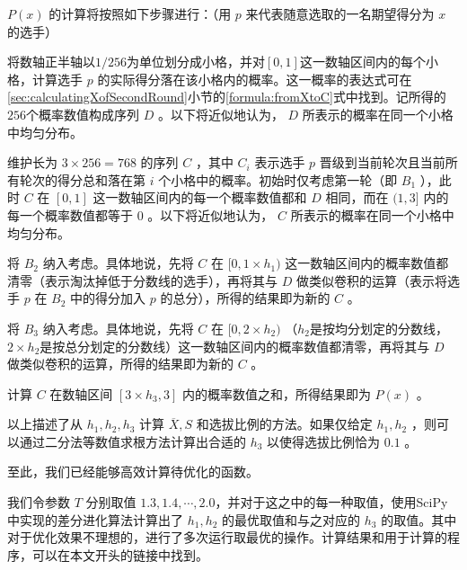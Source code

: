         $P(x)$ 的计算将按照如下步骤进行：（用 $p$ 来代表随意选取的一名期望得分为 $x$ 的选手）
        \begin{asparaenum}[\bfseries{步骤} 1.]
            \item 将数轴正半轴以$1/256$为单位划分成小格，并对$[0,1]$这一数轴区间内的每个小格，计算选手 $p$ 的实际得分落在该小格内的概率。这一概率的表达式可在\ref{sec:calculatingXofSecondRound}小节的\eqref{formula:fromXtoC}式中找到。记所得的$256$个概率数值构成序列 $D$ 。以下将近似地认为， $D$ 所表示的概率在同一个小格中均匀分布。
            \item 维护长为 $3\times256=768$ 的序列 $C$ ，其中 $C_i$ 表示选手 $p$ 晋级到当前轮次且当前所有轮次的得分总和落在第 $i$ 个小格中的概率。初始时仅考虑第一轮（即 $B_1$ ），此时 $C$ 在 $[0,1]$ 这一数轴区间内的每一个概率数值都和 $D$ 相同，而在 $(1,3]$ 内的每一个概率数值都等于 $0$ 。以下将近似地认为， $C$ 所表示的概率在同一个小格中均匀分布。
            \item 将 $B_2$ 纳入考虑。具体地说，先将 $C$ 在 $[0,1\times h_1)$ 这一数轴区间内的概率数值都清零（表示淘汰掉低于分数线的选手），再将其与 $D$ 做类似卷积的运算（表示将选手 $p$ 在 $B_2$ 中的得分加入 $p$ 的总分），所得的结果即为新的 $C$ 。
            \item 将 $B_3$ 纳入考虑。具体地说，先将 $C$ 在 $[0,2\times h_2)$ （$h_2$是按均分划定的分数线，$2\times h_2$是按总分划定的分数线）这一数轴区间内的概率数值都清零，再将其与 $D$ 做类似卷积的运算，所得的结果即为新的 $C$ 。
            \item 计算 $C$ 在数轴区间 $[3\times h_3,3]$ 内的概率数值之和，所得结果即为 $P(x)$ 。
        \end{asparaenum}

        \vspace{1.5ex}

        以上描述了从 $h_1,h_2,h_3$ 计算 $\overline{X},S$ 和选拔比例的方法。如果仅给定 $h_1,h_2$ ，则可以通过二分法等数值求根方法计算出合适的 $h_3$ 以使得选拔比例恰为 $0.1$ 。
        
        至此，我们已经能够高效计算待优化的函数。

        \vspace{1.5ex}

        我们令参数 $T$ 分别取值 $1.3,1.4,\cdots,2.0$，并对于这之中的每一种取值，使用SciPy中实现的差分进化算法\cite{scipy_de}计算出了 $h_1,h_2$ 的最优取值和与之对应的 $h_3$ 的取值。其中对于优化效果不理想的，进行了多次运行取最优的操作。计算结果和用于计算的程序，可以在本文开头的链接中找到。

